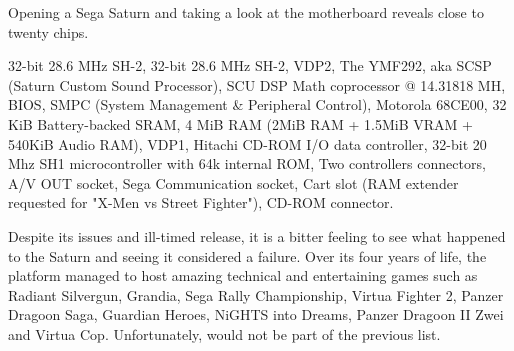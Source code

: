\pagebreak





\par
Opening a Sega Saturn and taking a look at the motherboard reveals close to twenty chips.\\
\par
{} 32-bit 28.6 MHz SH-2, 
 32-bit 28.6 MHz SH-2, 
 VDP2, 
 The YMF292, aka SCSP (Saturn Custom Sound Processor), 
 SCU DSP Math coprocessor @ 14.31818 MH, 
 BIOS, 
 SMPC (System Management \& Peripheral Control), 
 Motorola 68CE00, 
 32 KiB Battery-backed SRAM, 
 4 MiB RAM (2MiB RAM + 1.5MiB VRAM + 540KiB Audio RAM), 
 VDP1, 
 Hitachi CD-ROM I/O data controller, 
 32-bit 20 Mhz SH1  microcontroller with 64k internal ROM, 
 Two controllers connectors, 
 A/V OUT socket,  
 Sega Communication socket,  
 Cart slot (RAM extender requested for "X-Men vs Street Fighter"), 
 CD-ROM connector.






Despite its issues and ill-timed release, it is a bitter feeling to see what happened to the Saturn and seeing it considered a failure. Over its four years of life, the platform managed to host amazing technical and entertaining games such as Radiant Silvergun, Grandia, Sega Rally Championship, Virtua Fighter 2, Panzer Dragoon Saga, Guardian Heroes, NiGHTS into Dreams, Panzer Dragoon II Zwei and Virtua Cop. Unfortunately, \doom{} would not be part of the previous list.\\
\par
{}




























